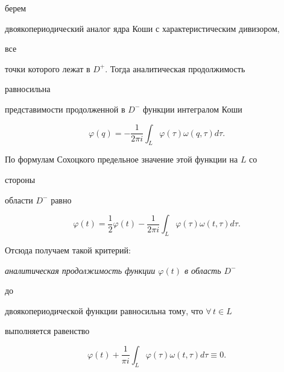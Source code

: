 берем 


двоякопериодический аналог ядра Коши с характеристическим дивизором, 


все 


точки которого лежат в $D^+$. Тогда аналитическая продолжимость 


равносильна 


представимости продолженной в $D^-$ функции интегралом Коши


$$ 


\varphi(q)=-\frac{1}{2\pi i}\int_L \varphi(\tau)\omega(q,\tau)d\tau. 


$$ 


По формулам Сохоцкого предельное значение этой функции на $L$ со 


стороны 


области $D^-$ равно 


$$ 


\varphi(t)=\frac{1}{2}\varphi(t)-\frac{1}{2\pi i}\int_L 


\varphi(\tau)\omega(t,\tau)d\tau. 


$$ 


Отсюда получаем такой критерий:


 


{\it аналитическая продолжимость функции $\varphi(t)$ в область $D^-$ 


до 


двоякопериодической функции равносильна тому, что $\forall\,t\in L$ 


выполняется равенство} 


$$ 


\varphi(t)+\frac{1}{\pi i}\int_L \varphi(\tau)\omega(t,\tau) 


d\tau\equiv0. 


$$ 


 


